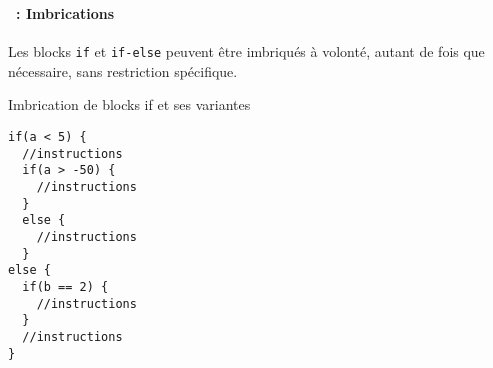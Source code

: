 \begin{frame}[containsverbatim]
  \frametitle{\secname}
  \framesubtitle{\subsecname~: Imbrications}

  Les blocks \verb|if| et \verb|if-else| peuvent être imbriqués à volonté, autant de fois que nécessaire, sans restriction spécifique.
  {\footnotesize\begin{exampleblock}{Imbrication de blocks if et ses variantes}
    \begin{verbatim}
if(a < 5) {
  //instructions
  if(a > -50) {
    //instructions
  }
  else {
    //instructions
  }
else {
  if(b == 2) {
    //instructions
  }
  //instructions
}\end{verbatim}
  \end{exampleblock}}
\end{frame}

